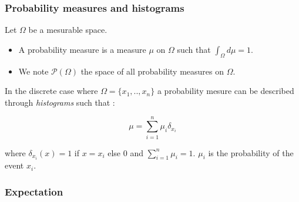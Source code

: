 \documentclass[french,9pt]{beamer}
\begin{document}
\begin{frame}
\frametitle{Probability measures and histograms}

Let $\Omega$ be a mesurable space.
\begin{itemize}
\item A probability measure is a measure $\mu$ on $\Omega$ such that $\int_{\Omega} d\mu=1$.
\item We note $\mathcal{P}(\Omega)$ the space of all probability measures on $\Omega$.
\end{itemize}

In the discrete case where  $\Omega=\{x_{1},..,x_{n}\}$ a probability mesure can be described through \emph{histograms} such that :

$$\mu=\sum_{i=1}^{n} \mu_{i} \delta_{x_{i}} $$

 where $\delta_{x_{i}}(x)=1$ if $x=x_{i}$ else $0$ and $\sum_{i=1}^{n} \mu_{i}=1$. $\mu_{i}$ is the probability of the event $x_{i}$. 


\end{frame}



\begin{frame}
\frametitle{Expectation}



\end{frame}

\end{document}
